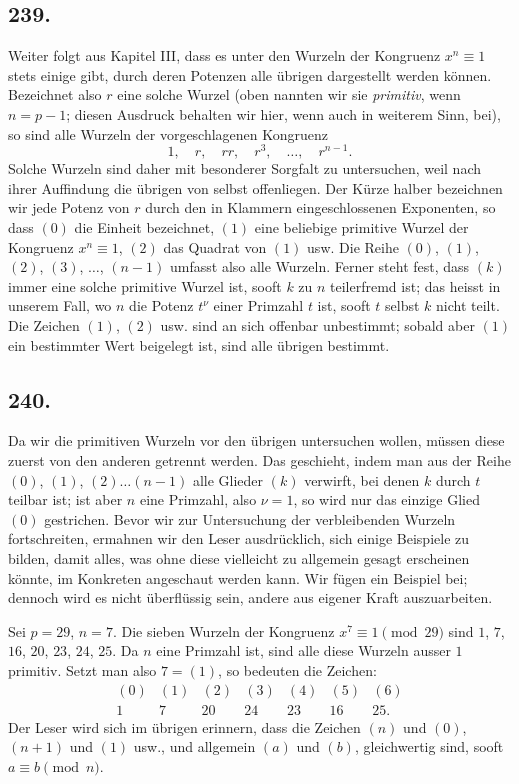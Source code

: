 \documentclass[12pt]{article}
\begin{document}
\subsection*{239.}
Weiter folgt aus Kapitel III, dass es unter den Wurzeln der Kongruenz $x^n\equiv 1$ stets einige gibt, durch deren Potenzen alle übrigen dargestellt werden können. Bezeichnet also $r$ eine solche Wurzel (oben nannten wir sie \textit{primitiv}, wenn $n=p-1$; diesen Ausdruck behalten wir hier, wenn auch in weiterem Sinn, bei), so sind alle Wurzeln der vorgeschlagenen Kongruenz
\[
1,\quad r,\quad rr,\quad r^3,\quad \ldots,\quad r^{n-1}.
\]
Solche Wurzeln sind daher mit besonderer Sorgfalt zu untersuchen, weil nach ihrer Auffindung die übrigen von selbst offenliegen. Der Kürze halber bezeichnen wir jede Potenz von $r$ durch den in Klammern eingeschlossenen Exponenten, so dass $(0)$ die Einheit bezeichnet, $(1)$ eine beliebige primitive Wurzel der Kongruenz $x^n\equiv 1$, $(2)$ das Quadrat von $(1)$ usw. Die Reihe $(0)$, $(1)$, $(2)$, $(3)$, $\ldots$, $(n-1)$ umfasst also alle Wurzeln. Ferner steht fest, dass $(k)$ immer eine solche primitive Wurzel ist, sooft $k$ zu $n$ teilerfremd ist; das heisst in unserem Fall, wo $n$ die Potenz $t^\nu$ einer Primzahl $t$ ist, sooft $t$ selbst $k$ nicht teilt. Die Zeichen $(1)$, $(2)$ usw. sind an sich offenbar unbestimmt; sobald aber $(1)$ ein bestimmter Wert beigelegt ist, sind alle übrigen bestimmt.

\subsection*{240.}
Da wir die primitiven Wurzeln vor den übrigen untersuchen wollen, müssen diese zuerst von den anderen getrennt werden. Das geschieht, indem man aus der Reihe $(0)$, $(1)$, $(2)\ldots(n-1)$ alle Glieder $(k)$ verwirft, bei denen $k$ durch $t$ teilbar ist; ist aber $n$ eine Primzahl, also $\nu=1$, so wird nur das einzige Glied $(0)$ gestrichen. Bevor wir zur Untersuchung der verbleibenden Wurzeln fortschreiten, ermahnen wir den Leser ausdrücklich, sich einige Beispiele zu bilden, damit alles, was ohne diese vielleicht zu allgemein gesagt erscheinen könnte, im Konkreten angeschaut werden kann. Wir fügen ein Beispiel bei; dennoch wird es nicht überflüssig sein, andere aus eigener Kraft auszuarbeiten.

Sei $p=29$, $n=7$. Die sieben Wurzeln der Kongruenz $x^7\equiv 1\pmod {29}$ sind $1$, $7$, $16$, $20$, $23$, $24$, $25$. Da $n$ eine Primzahl ist, sind alle diese Wurzeln ausser $1$ primitiv. Setzt man also $7=(1)$, so bedeuten die Zeichen:
\[
\begin{array}{ccccccc}
(0)&(1)&(2)&(3)&(4)&(5)&(6)\\
1&7&20&24&23&16&25.
\end{array}
\]
Der Leser wird sich im übrigen erinnern, dass die Zeichen $(n)$ und $(0)$, $(n+1)$ und $(1)$ usw., und allgemein $(a)$ und $(b)$, gleichwertig sind, sooft $a\equiv b\pmod n$.
\end{document}
